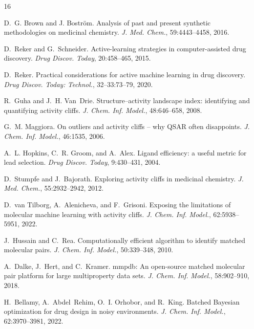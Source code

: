 \documentclass[sigconf, nonacm]{acmart}
\begin{document}
\begin{thebibliography}{16}

D.~G. Brown and J. Bostr\"{o}m.
\newblock Analysis of past and present synthetic methodologies on medicinal chemistry.
\newblock \textit{J. Med. Chem.}, 59:4443--4458, 2016.

D.~Reker and G.~Schneider.
\newblock Active-learning strategies in computer-assisted drug discovery.
\newblock \textit{Drug Discov. Today}, 20:458--465, 2015.

D.~Reker.
\newblock Practical considerations for active machine learning in drug discovery.
\newblock \textit{Drug Discov. Today: Technol.}, 32--33:73--79, 2020.

R.~Guha and J.~H. Van~Drie.
\newblock Structure--activity landscape index: identifying and quantifying activity cliffs.
\newblock \textit{J. Chem. Inf. Model.}, 48:646--658, 2008.

G.~M. Maggiora.
\newblock On outliers and activity cliffs -- why QSAR often disappoints.
\newblock \textit{J. Chem. Inf. Model.}, 46:1535, 2006.

A.~L. Hopkins, C.~R. Groom, and A.~Alex.
\newblock Ligand efficiency: a useful metric for lead selection.
\newblock \textit{Drug Discov. Today}, 9:430--431, 2004.

D.~Stumpfe and J.~Bajorath.
\newblock Exploring activity cliffs in medicinal chemistry.
\newblock \textit{J. Med. Chem.}, 55:2932--2942, 2012.

D.~van Tilborg, A.~Alenicheva, and F.~Grisoni.
\newblock Exposing the limitations of molecular machine learning with activity cliffs.
\newblock \textit{J. Chem. Inf. Model.}, 62:5938--5951, 2022.

J.~Hussain and C.~Rea.
\newblock Computationally efficient algorithm to identify matched molecular pairs.
\newblock \textit{J. Chem. Inf. Model.}, 50:339--348, 2010.

A.~Dalke, J.~Hert, and C.~Kramer.
\newblock mmpdb: An open-source matched molecular pair platform for large multiproperty data sets.
\newblock \textit{J. Chem. Inf. Model.}, 58:902--910, 2018.

H.~Bellamy, A.~Abdel~Rehim, O.~I. Orhobor, and R.~King.
\newblock Batched Bayesian optimization for drug design in noisy environments.
\newblock \textit{J. Chem. Inf. Model.}, 62:3970--3981, 2022.


\end{thebibliography}
\end{document}
